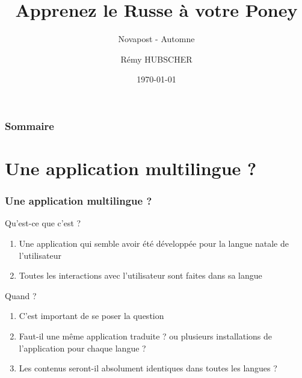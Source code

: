 \documentclass{beamer}
\title[Un poney qui parle le Russe]{Apprenez le Russe à votre Poney}
\subtitle{Novapost - Automne \the\year}
\author{Rémy HUBSCHER}
\institute{remy.hubscher@novapost.fr}
\date{\today}
\begin{document}

\begin{frame}[plain]
  \titlepage
\end{frame}


\begin{frame}
  \frametitle{Sommaire}
\end{frame}


\section{Une application multilingue ?}

\begin{frame}
  \frametitle{Une application multilingue ?}
  \begin{exampleblock}{Qu'est-ce que c'est ?}
    \begin{enumerate}
      \pause \item Une application qui semble avoir été développée pour la langue natale de l'utilisateur
      \pause \item Toutes les interactions avec l'utilisateur sont faites dans sa langue
    \end{enumerate}
  \end{exampleblock}
    \pause
  \begin{alertblock}{Quand ?}
    \begin{enumerate}
      \pause \item C'est important de se poser la question
      \pause \item Faut-il une même application traduite ? ou plusieurs installations de l'application pour chaque langue ?
      \pause \item Les contenus seront-il absolument identiques dans toutes les langues ?
    \end{enumerate}
  \end{alertblock}
\end{frame}
\end{document}
